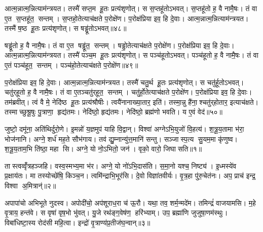 आत्म॒न्नात्म॒न्नित्याम॑न्त्रयत। तस्मै॑ सप्त॒म हू॒तः प्रत्य॑शृणोत्। स स॒प्तहू॑तोऽभवत्। स॒प्तहू॑तो ह॒ वै नामै॒षः। तं वा ए॒त स॒प्तहू॑त॒ सन्तम्। स॒प्तहो॒तेत्याच॑क्षते प॒रोक्षे॑ण। प॒रोक्ष॑प्रिया इव॒ हि दे॒वाः। आत्म॒न्नात्म॒न्नित्याम॑न्त्रयत। तस्मै॑ ष॒ष्ठ हू॒तः प्रत्य॑शृणोत्। स षड्ढू॑तोऽभवत्॥४८॥

षड्ढू॑तो ह॒ वै नामै॒षः। तं वा ए॒त षड्ढू॑त॒ सन्तम्। षड्ढो॒तेत्याच॑क्षते प॒रोक्षे॑ण। प॒रोक्ष॑प्रिया इव॒ हि दे॒वाः। आत्म॒न्नात्म॒न्नित्याम॑न्त्रयत। तस्मै॑ पञ्च॒म हू॒तः प्रत्य॑शृणोत्। स पञ्च॑हूतोऽभवत्। पञ्च॑हूतो ह॒ वै नामै॒षः। तं वा ए॒तं पञ्च॑हूत॒ सन्तम्। पञ्च॑हो॒तेत्याच॑क्षते प॒रोक्षे॑ण॥४९॥

प॒रोक्ष॑प्रिया इव॒ हि दे॒वाः। आत्म॒न्नात्म॒न्नित्याम॑न्त्रयत। तस्मै॑ चतु॒र्थ हू॒तः प्रत्य॑शृणोत्। स चतु॑र्\mbox{}हूतोऽभवत्। चतु॑र्‌हूतो ह॒ वै नामै॒षः। तं वा ए॒तञ्चतु॑र्‌हूत॒ सन्तम्। चतु॑र्हो॒तेत्याच॑क्षते प॒रोक्षे॑ण। प॒रोक्ष॑प्रिया इव॒ हि दे॒वाः। तम॑ब्रवीत्। त्वं वै मे॒ नेदि॑ष्ठ हू॒तः प्रत्य॑श्रौषीः। त्वयै॑नानाख्या॒तार॒ इति॑। तस्मा॒न्नु है॑ना॒श्चतु॑र्‌होतार॒ इत्याच॑क्षते। तस्माच्छुश्रू॒षुः पु॒त्राणा॒ हृद्य॑तमः। नेदि॑ष्ठो॒ हृद्य॑तमः। नेदि॑ष्ठो॒ ब्रह्म॑णो भवति। य ए॒वं वेद॑॥५०॥



\clearpage
{}
\setcounter{anuvakam}{0}
जुष्टो॒ दमू॑ना॒ अति॑थिर्दुरो॒णे। इ॒मन्नो॑ य॒ज्ञमुप॑ याहि वि॒द्वान्। विश्वा॑ अग्नेऽभि॒युजो॑ वि॒हत्य॑। श॒त्रू॒य॒तामा भ॑रा॒ भोज॑नानि। अग्ने॒ शर्ध॑ मह॒ते सौभ॑गाय। तव॑ द्यु॒म्नान्यु॑त्त॒मानि॑ सन्तु। सञ्जास्प॒त्य सु॒यम॒मा कृ॑णुष्व। श॒त्रू॒य॒ताम॒भि ति॑ष्ठा॒ महा सि। अग्ने॒ यो नो॒ऽभितो॒ जन॑। वृको॒ वारो॒ जिघासति॥१॥

तास्त्वव्वृँ॑त्रहञ्जहि। वस्व॒स्मभ्य॒मा भ॑र। अग्ने॒ यो नो॑ऽभि॒दास॑ति। स॒मा॒नो यश्च॒ निष्ट्य॑। इ॒ध्मस्ये॑व प्र॒क्षाय॑तः। मा तस्योच्छे॑षि॒ किञ्च॒न। त्वमि॑न्द्राभि॒भूर॑सि। दे॒वो विज्ञा॑तवीर्यः। वृ॒त्र॒हा पु॑रु॒चेत॑नः। अप॒ प्राच॑ इन्द्र॒ विश्वा अ॒मित्रान्॑॥२॥

अपापा॑चो अभिभूते नुदस्व। अपोदी॑चो॒ अप॑शूराध॒रा च॑ ऊ॒रौ। यथा॒ तव॒ शर्म॒न्मदे॑म। तमिन्द्रं॑ वाजयामसि। म॒हे वृ॒त्राय॒ हन्त॑वे। स वृषा॑ वृष॒भो भु॑वत्। यु॒जे रथ॑ङ्ग॒वेष॑ण॒ हरि॑भ्याम्। उप॒ ब्रह्मा॑णि जुजुषा॒णम॑स्थुः। विबा॑धिष्टा॒स्य रोद॑सी महि॒त्वा। इन्द्रो॑ वृ॒त्राण्य॑प्र॒तीज॑घ॒न्वान्॥३॥

